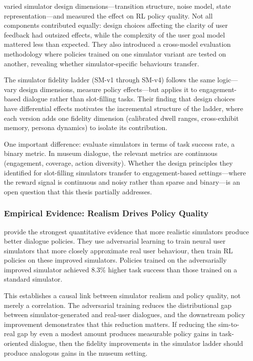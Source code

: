\documentclass[a4paper, 11pt]{article}
\begin{document}
\citet{kreyssig2019neural} varied simulator design dimensions---transition structure, noise model, state representation---and measured the effect on RL policy quality. Not all components contributed equally: design choices affecting the clarity of user feedback had outsized effects, while the complexity of the user goal model mattered less than expected. They also introduced a cross-model evaluation methodology where policies trained on one simulator variant are tested on another, revealing whether simulator-specific behaviours transfer.

The simulator fidelity ladder (SM-v1 through SM-v4) follows the same logic---vary design dimensions, measure policy effects---but applies it to engagement-based dialogue rather than slot-filling tasks. Their finding that design choices have differential effects motivates the incremental structure of the ladder, where each version adds one fidelity dimension (calibrated dwell ranges, cross-exhibit memory, persona dynamics) to isolate its contribution.

One important difference: \citet{kreyssig2019neural} evaluate simulators in terms of task success rate, a binary metric. In museum dialogue, the relevant metrics are continuous (engagement, coverage, action diversity). Whether the design principles they identified for slot-filling simulators transfer to engagement-based settings---where the reward signal is continuous and noisy rather than sparse and binary---is an open question that this thesis partially addresses.

\subsubsection{Empirical Evidence: Realism Drives Policy Quality}

\citet{yang2023adversarial} provide the strongest quantitative evidence that more realistic simulators produce better dialogue policies. They use adversarial learning to train neural user simulators that more closely approximate real user behaviour, then train RL policies on these improved simulators. Policies trained on the adversarially improved simulator achieved 8.3\% higher task success than those trained on a standard simulator.

This establishes a causal link between simulator realism and policy quality, not merely a correlation. The adversarial training reduces the distributional gap between simulator-generated and real-user dialogues, and the downstream policy improvement demonstrates that this reduction matters. If reducing the sim-to-real gap by even a modest amount produces measurable policy gains in task-oriented dialogue, then the fidelity improvements in the simulator ladder should produce analogous gains in the museum setting.
\end{document}
